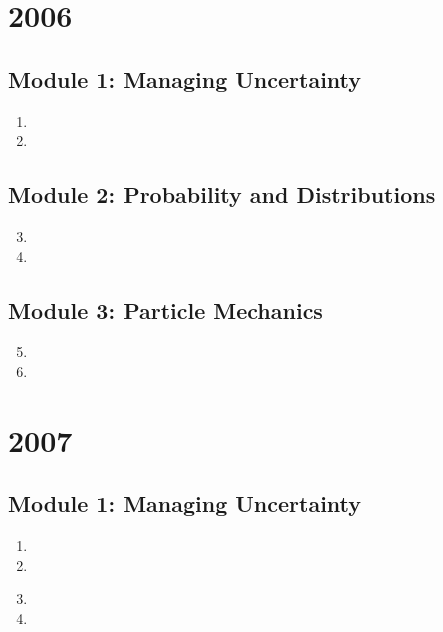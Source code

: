 \documentclass[fleqn,titlepage]{book}
\numberwithin{equation}{section}
\theoremstyle{plain}
\theoremstyle{definition}
\theoremstyle{remark}
\begin{document}
\chapter{2006}
\section{Module 1: Managing Uncertainty}
\begin{enumerate}[label=\bfseries  \arabic*.]\setcounter{enumi}{0}
\item 
\item 
\end{enumerate}
\section{Module 2: Probability and Distributions}
\begin{enumerate}[label=\bfseries  \arabic*.]\setcounter{enumi}{2}
\item 
\item 
\end{enumerate}
\section{Module 3: Particle Mechanics}
\begin{enumerate}[label=\bfseries  \arabic*.]\setcounter{enumi}{4}
\item 
\item 
\end{enumerate}

\chapter{2007}
\section{Module 1: Managing Uncertainty}
\begin{enumerate}[label=\bfseries  \arabic*.]\setcounter{enumi}{0}
\item 
\item 
\end{enumerate}
\begin{enumerate}[label=\bfseries  \arabic*.]\setcounter{enumi}{2}
\section{Module 2: Probability and Distributions}
\item 
\item 
\end{enumerate}
\end{document}
